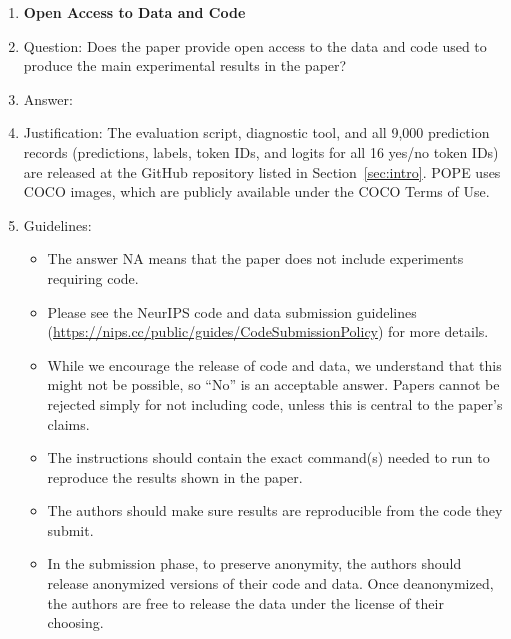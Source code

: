 \begin{enumerate}
\item {\bf Open Access to Data and Code}
\item[] Question: Does the paper provide open access to the data and code used
to produce the main experimental results in the paper?
\item[] Answer: \answerYes{}
\item[] Justification: The evaluation script, diagnostic tool, and all 9,000
prediction records (predictions, labels, token IDs, and logits for all 16
yes/no token IDs) are released at the GitHub repository listed in
Section~\ref{sec:intro}. POPE uses COCO images, which are publicly available
under the COCO Terms of Use.
\item[] Guidelines:
\begin{itemize}
    \item The answer NA means that the paper does not include experiments
    requiring code.
    \item Please see the NeurIPS code and data submission guidelines
    (\url{https://nips.cc/public/guides/CodeSubmissionPolicy}) for more details.
    \item While we encourage the release of code and data, we understand that
    this might not be possible, so ``No'' is an acceptable answer. Papers
    cannot be rejected simply for not including code, unless this is central
    to the paper's claims.
    \item The instructions should contain the exact command(s) needed to run to
    reproduce the results shown in the paper.
    \item The authors should make sure results are reproducible from the code
    they submit.
    \item In the submission phase, to preserve anonymity, the authors should
    release anonymized versions of their code and data. Once deanonymized, the
    authors are free to release the data under the license of their choosing.
\end{itemize}


\end{enumerate}
